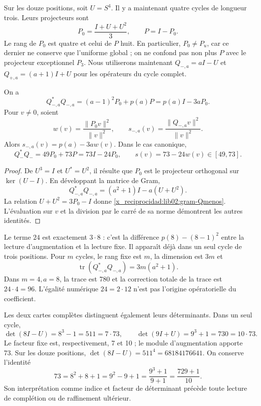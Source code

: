 Sur les douze positions, soit \(U=S^4\). Il y a maintenant quatre cycles de
longueur trois. Leurs projecteurs sont
\[
 P_0=\frac{I+U+U^2}{3},\qquad P=I-P_0.
\]
Le rang de \(P_0\) est quatre et celui de \(P\) huit. En particulier,
\(P_0\ne P_u\), car ce dernier ne conserve que l’uniforme global ;
on ne confond pas non plus \(P\) avec le projecteur exceptionnel \(P_3\).
Nous utiliserons maintenant \(Q_{-,a}=aI-U\) et \(Q_{+,a}=(a+1)I+U\)
pour les opérateurs du cycle complet.

\begin{theorem}
\label{x_reciprocidad:lib02:gram-ternario}
On a
\begin{equation}
 Q_{-,a}^*Q_{-,a}
 =(a-1)^2P_0+p(a)P=p(a)I-3aP_0.
 \label{x_reciprocidad:lib02:gram-Qmenos}
\end{equation}
Pour \(v\ne0\), soient
\[
 w(v)=\frac{\|P_0v\|^2}{\|v\|^2},\qquad
 s_{-,a}(v)=\frac{\|Q_{-,a}v\|^2}{\|v\|^2}.
\]
Alors \(s_{-,a}(v)=p(a)-3aw(v)\). Dans le cas canonique,
\begin{equation}
 Q_-^*Q_-=49P_0+73P=73I-24P_0,
 \qquad s(v)=73-24w(v)\in[49,73].
 \label{x_reciprocidad:lib02:73-24w}
\end{equation}
\end{theorem}
\begin{proof}
De \(U^3=I\) et \(U^*=U^2\), il résulte que \(P_0\) est le projecteur orthogonal sur \(\ker(U-I)\). En développant la matrice de Gram,
\[
 Q_{-,a}^*Q_{-,a}=(a^2+1)I-a(U+U^2).
\]
La relation \(U+U^2=3P_0-I\) donne \eqref{x_reciprocidad:lib02:gram-Qmenos}. L'évaluation sur \(v\) et la division par le carré de sa norme démontrent les autres identités.
\end{proof}

Le terme \(24\) est exactement \(3\cdot8\) : c’est la différence
\(p(8)-(8-1)^2\) entre la lecture d’augmentation et la lecture fixe. Il apparaît déjà
dans un seul cycle de trois positions. Pour \(m\) cycles, le rang fixe
est \(m\), la dimension est \(3m\) et
\[
 \operatorname{tr}(Q_{-,a}^*Q_{-,a})=3m(a^2+1).
\]
Dans \(m=4,a=8\), la trace est 780 et la correction totale de la trace
est \(24\cdot4=96\). L’égalité numérique \(24=2\cdot12\) n’est pas
l’origine opératorielle du coefficient.

Les deux cartes complètes distinguent également leurs déterminants. Dans un seul cycle,
\[
 \det(8I-U)=8^3-1=511=7\cdot73,
 \qquad
 \det(9I+U)=9^3+1=730=10\cdot73.
\]
Le facteur fixe est, respectivement, 7 et 10 ; le module d'augmentation apporte 73. Sur les douze positions, \(\det(8I-U)=511^4=68184176641\). On conserve l'identité
\begin{equation}
 73=8^2+8+1=9^2-9+1=\frac{9^3+1}{9+1}
 =\frac{729+1}{10}.
 \label{x_reciprocidad:lib02:completacion73}
\end{equation}
Son interprétation comme indice et facteur de déterminant précède
toute lecture de complétion ou de raffinement ultérieur.

